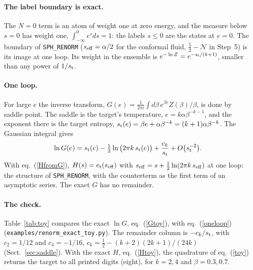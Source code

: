 \documentclass[11pt,aps,preprint,nofootinbib,superscriptaddress,tightenlines]{revtex4-2}
\def\st{\begin{equation}}
\def\stp{\end{equation}}
\def\Eq#1{eq.~(\ref{#1})}
\def\Sect#1{Sect.~\ref{#1}}
\def\Tab#1{Table~\ref{#1}}
\let\oldparagraph\paragraph
\renewcommand{\paragraph}{\par\bigskip\oldparagraph}
\begin{document}
\paragraph{The label boundary is exact.}  The $N=0$ term is an atom of weight one at zero energy, and the measure below $s=0$ has weight one,
$\int_{-\infty}^0e^{s}ds=1$: the labels $s\le0$ are the states at $e=0$.  The boundary of \texttt{SPH\_RENORM} ($s_{\rm eff}=\alpha/2$ for the
conformal fluid, $\tfrac52-\mathcal N$ in Step~5) is its image at one loop.  Its weight in the ensemble is $e^{-\ln Z}=e^{-s_{\rm t}/(k+1)}$,
smaller than any power of $1/s_{\rm t}$.

\paragraph{One loop.}  For large $e$ the inverse transform, $G(e)=\frac1{2\pi i}\int d\beta\,e^{\beta e}Z(\beta)/\beta$, is done by saddle point.
The saddle is the target's temperature, $e=k\alpha\beta^{-k-1}$, and the exponent there is the target entropy,
$s_{\rm t}(e)=\beta e+\alpha\beta^{-k}=(k+1)\alpha\beta^{-k}$.  The Gaussian integral gives
\st
\ln G(e)=s_{\rm t}(e)-\tfrac12\ln\big(2\pi k\,s_{\rm t}(e)\big)+\frac{c_k}{s_{\rm t}}+O\big(s_{\rm t}^{-2}\big) .
\label{oneloop}
\stp
With \Eq{HfromG}, $H(s)=e_{\rm t}(s_{\rm eff})$ with $s_{\rm eff}=s+\tfrac12\ln(2\pi k\,s_{\rm eff})$ at one loop: the structure of
\texttt{SPH\_RENORM}, with the counterterm as the first term of an asymptotic series.  The exact $G$ has no remainder.

\paragraph{The check.}  \Tab{tab:toy} compares the exact $\ln G$, \Eq{Gtoy}, with \Eq{oneloop} (\nolinkurl{examples/renorm_exact_toy.py}).  The remainder column is $-c_k/s_{\rm t}$, with $c_2=1/12$ and $c_4=-1/16$, $c_k=\tfrac12-(k+2)(2k+1)/(24k)$ (\Sect{sec:saddle}).  With the exact $H$, \Eq{Htoy}, the quadrature of
\Eq{toy} returns the target to all printed digits (eight), for $k=2,4$ and $\beta=0.3,0.7$.
\end{document}
